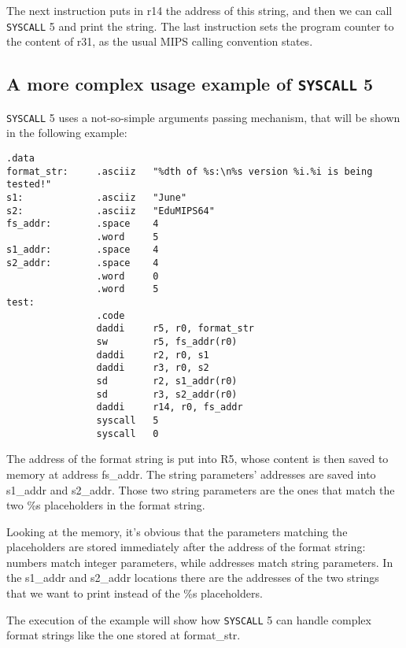 \documentclass[12pt]{report}
\newcommand{\SC}{\texttt{SYSCALL}}
\begin{document}
The next instruction puts in r14 the address of this string, and then we can
call \SC{} 5 and print the string. The last instruction sets the program counter
to the content of r31, as the usual MIPS calling convention states.

\subsection{A more complex usage example of \SC{} 5}
\SC{} 5 uses a not-so-simple arguments passing mechanism, that will be shown in
the following example:

\begin{lstlisting}[caption={More complex \SC{} 5 example}, label={code:printf}, style={mips}]
                .data
format_str:     .asciiz   "%dth of %s:\n%s version %i.%i is being tested!"
s1:             .asciiz   "June"
s2:             .asciiz   "EduMIPS64"
fs_addr:        .space    4
                .word     5    
s1_addr:        .space    4
s2_addr:        .space    4
                .word     0
                .word     5
test:
                .code
                daddi     r5, r0, format_str
                sw        r5, fs_addr(r0)
                daddi     r2, r0, s1
                daddi     r3, r0, s2
                sd        r2, s1_addr(r0)
                sd        r3, s2_addr(r0)
                daddi     r14, r0, fs_addr
                syscall   5
                syscall   0
\end{lstlisting}
The address of the format string is put into R5, whose content is then saved to
memory at address fs\_addr. The string parameters' addresses are saved into
s1\_addr and s2\_addr. Those two string parameters are the ones that match the
two \%s placeholders in the format string.

Looking at the memory, it's obvious that the parameters matching the
placeholders are stored immediately after the address of the format string:
numbers match integer parameters, while addresses match string parameters. In
the s1\_addr and s2\_addr locations there are the addresses of the two strings
that we want to print instead of the \%s placeholders.

The execution of the example will show how \SC{} 5 can handle complex format
strings like the one stored at format\_str.

\printindex
\end{document}
